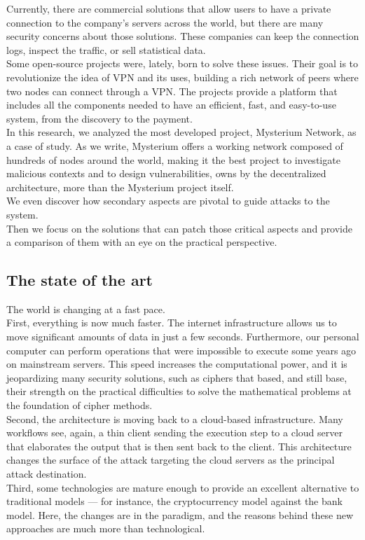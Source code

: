 \documentclass[12pt]{article}
\begin{document}
	Currently, there are commercial solutions that allow users to have a private connection to the company's servers across the world, but there are many security concerns about those solutions. These companies can keep the connection logs, inspect the traffic, or sell statistical data.\\
    Some open-source projects were, lately, born to solve these issues. Their goal is to revolutionize the idea of VPN and its uses, building a rich network of peers where two nodes can connect through a VPN. The projects provide a platform that includes all the components needed to have an efficient, fast, and easy-to-use system, from the discovery to the payment.\\
    
    In this research, we analyzed the most developed project, Mysterium Network, as a case of study. As we write, Mysterium offers a working network composed of hundreds of nodes around the world, making it the best project to investigate malicious contexts and to design vulnerabilities, owns by the decentralized architecture, more than the Mysterium project itself.\\
	We even discover how secondary aspects are pivotal to guide attacks to the system.\\
    Then we focus on the solutions that can patch those critical aspects and provide a comparison of them with an eye on the practical perspective.
	
	\subsection{The state of the art}
	The world is changing at a fast pace.\\
	First, everything is now much faster. The internet infrastructure allows us to move significant amounts of data in just a few seconds. Furthermore, our personal computer can perform operations that were impossible to execute some years ago on mainstream servers. This speed increases the computational power, and it is jeopardizing many security solutions, such as ciphers that based, and still base, their strength on the practical difficulties to solve the mathematical problems at the foundation of cipher methods.\\
	Second, the architecture is moving back to a cloud-based infrastructure. Many workflows see, again, a thin client sending the execution step to a cloud server that elaborates the output that is then sent back to the client. This architecture changes the surface of the attack targeting the cloud servers as the principal attack destination.\\
	Third, some technologies are mature enough to provide an excellent alternative to traditional models — for instance, the cryptocurrency model against the bank model. Here, the changes are in the paradigm, and the reasons behind these new approaches are much more than technological.\\
\end{document}
